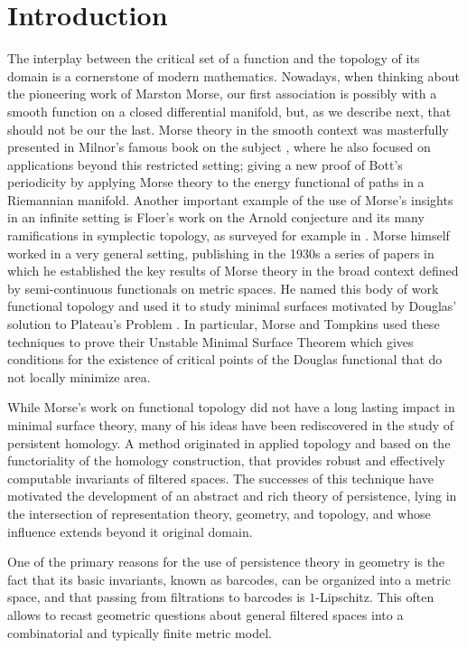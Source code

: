 
\section{Introduction}

The interplay between the critical set of a function and the topology of its domain is a cornerstone of modern mathematics.
Nowadays, when thinking about the pioneering work of Marston Morse, our first association is possibly with a smooth function on a closed differential manifold, but, as we describe next, that should not be our the last.
Morse theory in the smooth context was masterfully presented in Milnor's famous book on the subject \cite{MR0163331}, where he also focused on applications beyond this restricted setting;
giving a new proof of Bott's periodicity by applying Morse theory to the energy functional of paths in a Riemannian manifold.
Another important example of the use of Morse's insights in an infinite setting is Floer's work on the Arnold conjecture and its many ramifications in symplectic topology, as surveyed for example in \cite{MR1702944}.
Morse himself worked in a very general setting, publishing in the 1930s a series of papers \cite{Morse.1937, Morse.1938, Morse.1940, MR9102} in which he established the key results of Morse theory in the broad context defined by semi-continuous functionals on metric spaces.
He named this body of work functional topology and used it to study minimal surfaces motivated by Douglas' solution to Plateau’s Problem \cite{Douglas.1931}.
In particular, Morse and Tompkins \cite{Morse.1939, Morse.1941} used these techniques to prove their Unstable Minimal Surface Theorem which gives conditions for the existence of critical points of the Douglas functional that do not locally minimize area.

While Morse's work on functional topology did not have a long lasting impact in minimal surface theory, many of his ideas have been rediscovered in the study of persistent homology.
A method originated in applied topology and based on the functoriality of the homology construction, that provides robust and effectively computable invariants of filtered spaces.
The successes of this technique have motivated the development of an abstract and rich theory of persistence, lying in the intersection of representation theory, geometry, and topology, and whose influence extends beyond it original domain.

One of the primary reasons for the use of persistence theory in geometry is the fact that its basic invariants, known as barcodes, can be organized into a metric space, and that passing from filtrations to barcodes is $1$-Lipschitz.
This often allows to recast geometric questions about general filtered spaces into a combinatorial and typically finite metric model.

